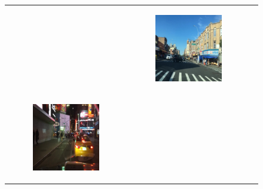 \begin{figure}
\begin{tabular}{p{\horspace} p{\horspace} p{\horspace}}
\begin{subfigure}[b]{\subfigwidth}
    \end{subfigure} 
    \hfill &
    \begin{subfigure}[b]{\subfigwidth}
        \includegraphics[width=\subfigwidth]{images/gpt4/d3.jpg}
    \end{subfigure} \\
    \begin{subfigure}[b]{\subfigwidth}
        \includegraphics[width=\subfigwidth]{images/gpt4/d4.jpg}

\end{subfigure}
\end{tabular}
\end{figure}
